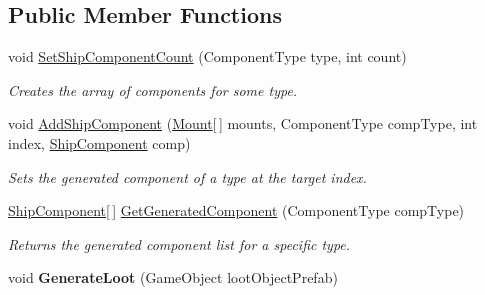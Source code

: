 \subsection*{Public Member Functions}
\begin{DoxyCompactItemize}
\item 
void \hyperlink{class_skyrates_1_1_client_1_1_ship_1_1_ship_hull_a708dd2846b4a6c0d2a04f017154ab23c}{Set\-Ship\-Component\-Count} (Component\-Type type, int count)
\begin{DoxyCompactList}\small\item\em Creates the array of components for some type. \end{DoxyCompactList}\item 
void \hyperlink{class_skyrates_1_1_client_1_1_ship_1_1_ship_hull_aca3fed341f7bb7d6e5b8c33031473b19}{Add\-Ship\-Component} (\hyperlink{struct_skyrates_1_1_client_1_1_ship_1_1_ship_hull_1_1_mount}{Mount}\mbox{[}$\,$\mbox{]} mounts, Component\-Type comp\-Type, int index, \hyperlink{class_skyrates_1_1_client_1_1_ship_1_1_ship_component}{Ship\-Component} comp)
\begin{DoxyCompactList}\small\item\em Sets the generated component of a type at the target index. \end{DoxyCompactList}\item 
\hyperlink{class_skyrates_1_1_client_1_1_ship_1_1_ship_component}{Ship\-Component}\mbox{[}$\,$\mbox{]} \hyperlink{class_skyrates_1_1_client_1_1_ship_1_1_ship_hull_a36b0a400d6afaeed933863f1f61ed2a5}{Get\-Generated\-Component} (Component\-Type comp\-Type)
\begin{DoxyCompactList}\small\item\em Returns the generated component list for a specific type. \end{DoxyCompactList}\item 
\hypertarget{class_skyrates_1_1_client_1_1_ship_1_1_ship_hull_a4fc5380bb332a96d20dc108b6f987946}{void {\bfseries Generate\-Loot} (Game\-Object loot\-Object\-Prefab)}\label{class_skyrates_1_1_client_1_1_ship_1_1_ship_hull_a4fc5380bb332a96d20dc108b6f987946}

\end{DoxyCompactItemize}
